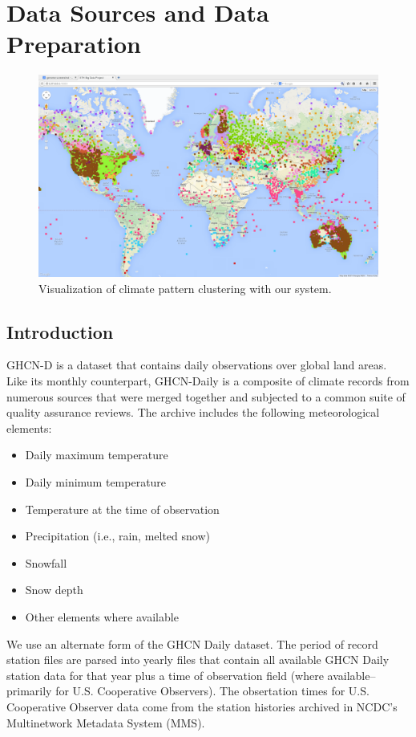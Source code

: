 \section{Data Sources and Data Preparation}

\begin{figure}[H]
\centering
\includegraphics[width=.85\linewidth]{./figure/Full_view.png}
	\caption{Visualization of climate pattern clustering with our system.}
	\label{fig:FullView}
\end{figure}

\subsection{Introduction}
GHCN-D is a dataset that contains daily observations over global land areas. 
Like its monthly counterpart, GHCN-Daily is a composite of climate records from 
numerous sources that were merged together and subjected to a common suite of quality 
assurance reviews. The archive includes the following meteorological elements:
\begin{itemize}
    \item Daily maximum temperature
    \item Daily minimum temperature
    \item Temperature at the time of observation
    \item Precipitation (i.e., rain, melted snow)
    \item Snowfall
    \item Snow depth
    \item Other elements where available
\end{itemize}

We use an alternate form of the GHCN Daily dataset. The period of record station files are parsed into  
yearly files that contain all available GHCN Daily station data for that year 
plus a time of observation field (where available--primarily for U.S. Cooperative 
Observers).  The obsertation times for U.S. Cooperative Observer data 
come from the station histories archived in NCDC's Multinetwork Metadata System (MMS).  

